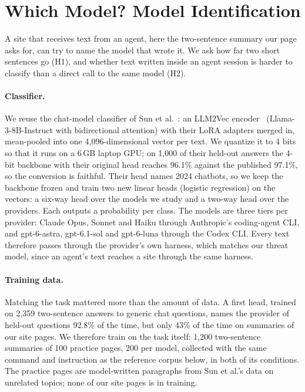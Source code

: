 
\section{Which Model? Model Identification}
\label{sec:model}

A site that receives text from an agent, here the two-sentence summary our page asks for, can try to
name the model that wrote it. We ask how far two short sentences go (H1), and whether text written
inside an agent session is harder to classify than a direct call to the same model (H2).

\paragraph{Classifier.} We reuse the chat-model classifier of Sun et al.~\cite{sun2025idiosyncrasies}:
an LLM2Vec encoder~\cite{behnamghader2024llm2vec} (Llama-3-8B-Instruct with bidirectional attention)
with their LoRA adapters merged in, mean-pooled into one 4,096-dimensional vector per text. We quantize
it to 4 bits so that it runs on a 6\,GB laptop GPU; on 1,000 of their held-out answers the 4-bit
backbone with their original head reaches 96.1\% against the published 97.1\%, so the conversion is
faithful. Their head names 2024 chatbots, so we keep the backbone frozen and train two new linear
heads (logistic regression) on the vectors: a six-way head over the models we study and a two-way head
over the providers. Each outputs a probability per class. The models are three tiers per provider:
Claude Opus, Sonnet and Haiku through Anthropic's coding-agent CLI, and gpt-6-astra, gpt-6.1-sol and
gpt-6-luna through the Codex CLI. Every text therefore passes through the provider's own harness,
which matches our threat model, since an agent's text reaches a site through the same harness.

\paragraph{Training data.} Matching the task mattered more than the amount of data. A first head,
trained on 2,359 two-sentence answers to generic chat questions, names the provider of held-out
questions 92.8\% of the time, but only 43\% of the time on summaries of our site pages. We therefore
train on the task itself: 1,200 two-sentence summaries of 100 practice pages, 200 per model,
collected with the same command and instruction as the reference corpus below, in both of its
conditions. The practice pages are model-written paragraphs from Sun et al.'s data on unrelated
topics; none of our site pages is in training.

